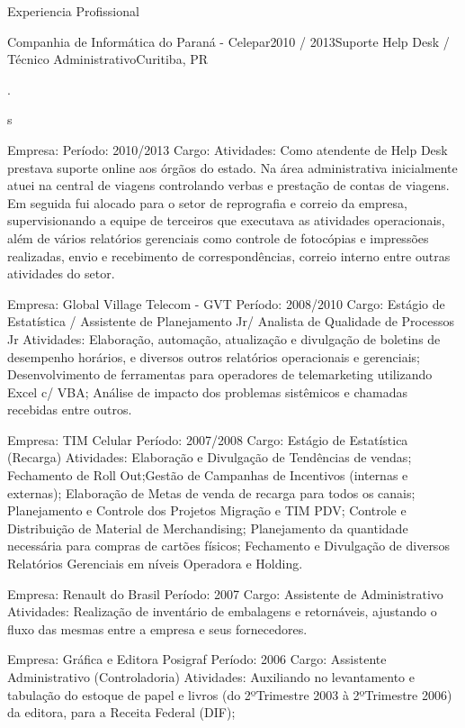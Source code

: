 \documentclass{resume} %
\begin{document}
\begin{rSection}{Experiencia Profissional}
\begin{rSubsection}{Companhia de Informática do Paraná - Celepar}{2010 / 2013}{Suporte Help Desk / Técnico Administrativo}{Curitiba, PR}
\item .
\item 
\item 
s
\end{rSubsection}



Empresa: 
Período: 2010/2013
Cargo: 
Atividades: Como atendente de Help Desk prestava suporte online aos órgãos do estado. Na área administrativa inicialmente
atuei na central de viagens controlando verbas e prestação de contas de viagens. Em seguida fui alocado para o setor de
reprografia e correio da empresa, supervisionando a equipe de terceiros que executava as atividades operacionais, além de
vários relatórios gerenciais como controle de fotocópias e impressões realizadas, envio e recebimento de correspondências,
correio interno entre outras atividades do setor.

Empresa: Global Village Telecom - GVT
Período: 2008/2010
Cargo: Estágio de Estatística / Assistente de Planejamento Jr/ Analista de Qualidade de Processos Jr
Atividades: Elaboração, automação, atualização e divulgação de boletins de desempenho horários, e diversos outros
relatórios operacionais e gerenciais; Desenvolvimento de ferramentas para operadores de telemarketing utilizando Excel c/
VBA; Análise de impacto dos problemas sistêmicos e chamadas recebidas entre outros.

Empresa: TIM Celular
Período: 2007/2008
Cargo: Estágio de Estatística (Recarga)
Atividades: Elaboração e Divulgação de Tendências de vendas; Fechamento de Roll Out;Gestão de Campanhas de Incentivos
(internas e externas); Elaboração de Metas de venda de recarga para todos os canais; Planejamento e Controle dos Projetos
Migração e TIM PDV; Controle e Distribuição de Material de Merchandising; Planejamento da quantidade necessária para
compras de cartões físicos; Fechamento e Divulgação de diversos Relatórios Gerenciais em níveis Operadora e Holding.

Empresa: Renault do Brasil
Período: 2007
Cargo: Assistente de Administrativo
Atividades: Realização de inventário de embalagens e retornáveis, ajustando o fluxo das mesmas entre a empresa e seus
fornecedores.

Empresa: Gráfica e Editora Posigraf
Período: 2006
Cargo: Assistente Administrativo (Controladoria)
Atividades: Auxiliando no levantamento e tabulação do estoque de papel e livros (do 2ºTrimestre 2003 à 2ºTrimestre 2006) da
editora, para a Receita Federal (DIF);


\end{rSection}
\end{document}
